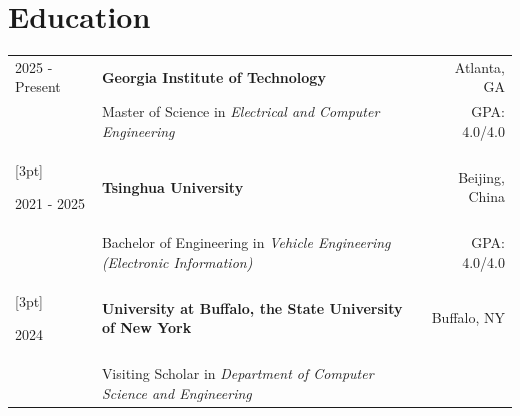 \documentclass[a4paper,10pt]{article}
\begin{document}
\section{Education}
\begin{tabularx}{\linewidth}{@{}l X r@{}}
2025 - Present & \textbf{Georgia Institute of Technology} & Atlanta, GA \\
& Master of Science in \textit{Electrical and Computer Engineering} & GPA: 4.0/4.0 \\
[3pt]

2021 - 2025 & \textbf{Tsinghua University} & Beijing, China \\
& Bachelor of Engineering in \textit{Vehicle Engineering (Electronic Information)} & GPA: 4.0/4.0 \\
[3pt]

2024 & \textbf{University at Buffalo, the State University of New York} & Buffalo, NY \\
& Visiting Scholar in \textit{Department of Computer Science and Engineering} & \\
\end{tabularx}

\end{document}
